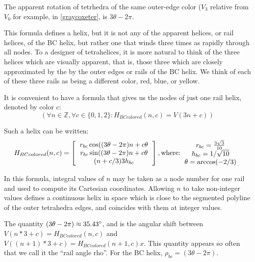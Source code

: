 \documentclass[11pt]{article}
\begin{document}
The apparent rotation of tetrhedra of the same outer-edge color ($V_3$ relative from $V_0$ for example,
in \eqref{graycoxeter}, is $3 \theta - 2\pi$.

This formula defines a helix, but it is not any of the apparent helices, or rail helices, of the
BC helix, but rather one that winds three times as rapidly through all
nodes. To a designer of tetrahelices, it is more natural to think of
the three helices which are visually apparent, that is, those three
which are closely approximated by the by the outer edges or rails of
the BC helix. We think of each of these three rails as being a different color, red, blue, or yellow.

It is convenient to have a formula that gives us the nodes of just
one rail helix, denoted by color $c$:
\[
(\forall n \in \mathbb{Z}, \forall c \in \{0,1,2\} : H_{BCcolored}(n,c) = V(3n +c))
\]

Such a helix can be written:
\begin{equation}
H_{BCcolored}(n,c) =
\left [
  \begin{tabular}{c}
   $ r_{bc}  \cos((3 \theta - 2 \pi)n + c  \theta $\\
   $ r_{bc} \sin((3 \theta - 2 \pi)n + c  \theta $\\
   $ (n + c/3) 3  h_{bc} $
  \end{tabular}
  \right ],
\text{where:}
  \begin{tabular}{c}
 $ r_{bc} = \frac{3\sqrt{3}}{10} $\\
 $ h_{bc} = 1/\sqrt{10} $ \\
 $ \theta = \arccos(-2/3) $ \\
  \end{tabular}      
\end{equation}

In this formula, integral values of $n$ may be taken as a node number for one rail and used to compute its Cartesian
coordinates. Allowing $n$ to take non-integer values defines a continuous
helix in space which is close to the segmented polyline of the outer tetrahedra edges, and coincides with them at integer
values.

The quantity $ (3 \theta - 2 \pi) \approx 35.43 \degree $, and is the angular shift between $V(n*3+c)=H_{BCcolored}(n,c)$ and
$V((n+1)*3+c)=H_{BCcolored}(n+1,c)x$.
This quantity appears so often that we call it the ``rail angle rho''. For the BC helix, $\rho_{bc} = (3 \theta - 2 \pi)$.
\end{document}

